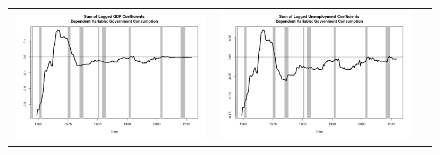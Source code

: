 \documentclass[12pt]{article}
\begin{document}
\begin{figure}
\begin{center}
\begin{tabular}{ccc}
\includegraphics[scale=0.34]{pics/coef_govcons_gdp.png} & \includegraphics[scale=0.34]{pics/coef_govcons_unemployment.png} \\

\end{tabular}
\end{center}
\end{figure}
\end{document}
